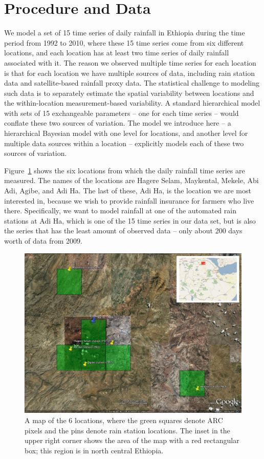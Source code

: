 \documentclass[12pt]{article}
\begin{document}
\section{Procedure and Data}
\label{sec:data}

We model a set of 15 time series of daily rainfall in Ethiopia during the time period from 1992 to 2010, where these 15 time series come from six different locations, and each location has at least two time series of daily rainfall associated with it. The reason we observed multiple time series for each location is that for each location we have multiple sources of data, including rain station data and satellite-based rainfall proxy data. The statistical challenge to modeling such data is to separately estimate the spatial variability between locations and the within-location measurement-based variability. A standard hierarchical model with sets of 15 exchangeable parameters -- one for each time series -- would conflate these two sources of variation. The model we introduce here -- a hierarchical Bayesian model with one level for locations, and another level for multiple data sources within a location -- explicitly models each of these two sources of variation.

Figure~\ref{fig_ethiopia_map} shows the six locations from which the daily rainfall time series are measured. The names of the locations are Hagere Selam, Maykental, Mekele, Abi Adi, Agibe, and Adi Ha. The last of these, Adi Ha, is the location we are most interested in, because we wish to provide rainfall insurance for farmers who live there. Specifically, we want to model rainfall at one of the automated rain stations at Adi Ha, which is one of the 15 time series in our data set, but is also the series that has the least amount of observed data -- only about 200 days worth of data from 2009.

\begin{figure}[htbp]
\begin{center}
\includegraphics[width=4.5in]{fig_ethiopia_papermap.jpg}
\caption{A map of the 6 locations, where the green squares denote ARC pixels and the pins denote rain station locations. The inset in the upper right corner shows the area of the map with a red rectangular box; this region is in north central Ethiopia.}
\label{fig_ethiopia_map}
\end{center}
\end{figure}
\end{document}
